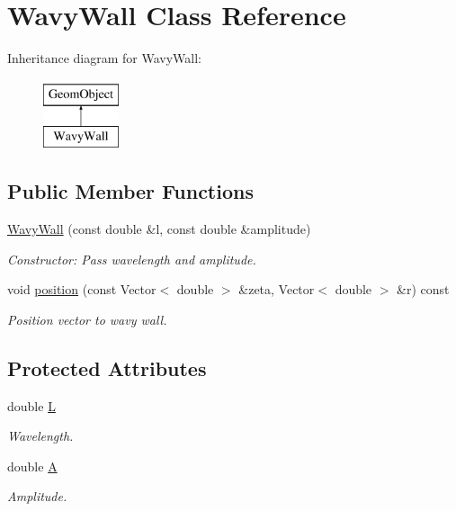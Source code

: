 \hypertarget{classWavyWall}{}\section{Wavy\+Wall Class Reference}
\label{classWavyWall}
Inheritance diagram for Wavy\+Wall\+:\begin{figure}[H]
\begin{center}
\leavevmode
\includegraphics[height=2.000000cm]{classWavyWall}
\end{center}
\end{figure}
\subsection*{Public Member Functions}
\begin{DoxyCompactItemize}
\item 
\hyperlink{classWavyWall_a7ef7a36cbce8798c1e4a99165dee8cc0}{Wavy\+Wall} (const double \&l, const double \&amplitude)
\begin{DoxyCompactList}\small\item\em Constructor\+: Pass wavelength and amplitude. \end{DoxyCompactList}\item 
void \hyperlink{classWavyWall_a9a9f5a98cb0d15ee801b52495be5e5bf}{position} (const Vector$<$ double $>$ \&zeta, Vector$<$ double $>$ \&r) const
\begin{DoxyCompactList}\small\item\em Position vector to wavy wall. \end{DoxyCompactList}\end{DoxyCompactItemize}
\subsection*{Protected Attributes}
\begin{DoxyCompactItemize}
\item 
double \hyperlink{classWavyWall_a598b42ece2600db9eb8c4d1dfeca9ad1}{L}
\begin{DoxyCompactList}\small\item\em Wavelength. \end{DoxyCompactList}\item 
double \hyperlink{classWavyWall_a435f0fb4db45b51eb371b66b244c7630}{A}
\begin{DoxyCompactList}\small\item\em Amplitude. \end{DoxyCompactList}\end{DoxyCompactItemize}


